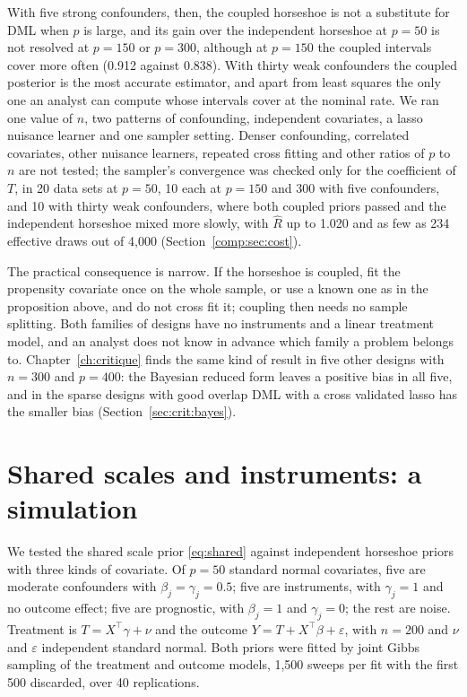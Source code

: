 With five strong confounders, then, the coupled horseshoe is not a substitute for DML when $p$ is large, and its gain over the independent horseshoe at $p = 50$ is not resolved at $p = 150$ or $p = 300$, although at $p = 150$ the coupled intervals cover more often (0.912 against 0.838). With thirty weak confounders the coupled posterior is the most accurate estimator, and apart from least squares the only one an analyst can compute whose intervals cover at the nominal rate. We ran one value of $n$, two patterns of confounding, independent covariates, a lasso nuisance learner and one sampler setting. Denser confounding, correlated covariates, other nuisance learners, repeated cross fitting and other ratios of $p$ to $n$ are not tested; the sampler's convergence was checked only for the coefficient of $T$, in 20 data sets at $p = 50$, 10 each at $p = 150$ and 300 with five confounders, and 10 with thirty weak confounders, where both coupled priors passed and the independent horseshoe mixed more slowly, with $\hat R$ up to 1.020 and as few as 234 effective draws out of 4,000 (Section~\ref{comp:sec:cost}).

The practical consequence is narrow. If the horseshoe is coupled, fit the propensity covariate once on the whole sample, or use a known one as in the proposition above, and do not cross fit it; coupling then needs no sample splitting. Both families of designs have no instruments and a linear treatment model, and an analyst does not know in advance which family a problem belongs to. Chapter~\ref{ch:critique} finds the same kind of result in five other designs with $n = 300$ and $p = 400$: the Bayesian reduced form leaves a positive bias in all five, and in the sparse designs with good overlap DML with a cross validated lasso has the smaller bias (Section~\ref{sec:crit:bayes}).

\section{Shared scales and instruments: a simulation}\label{sec:sharedsim}

We tested the shared scale prior \eqref{eq:shared} against independent horseshoe priors with three kinds of covariate. Of $p = 50$ standard normal covariates, five are moderate confounders with $\beta_j = \gamma_j = 0.5$; five are instruments, with $\gamma_j = 1$ and no outcome effect; five are prognostic, with $\beta_j = 1$ and $\gamma_j = 0$; the rest are noise. Treatment is $T = X^\top\gamma + \nu$ and the outcome $Y = T + X^\top\beta + \varepsilon$, with $n = 200$ and $\nu$ and $\varepsilon$ independent standard normal. Both priors were fitted by joint Gibbs sampling of the treatment and outcome models, 1,500 sweeps per fit with the first 500 discarded, over 40 replications.

